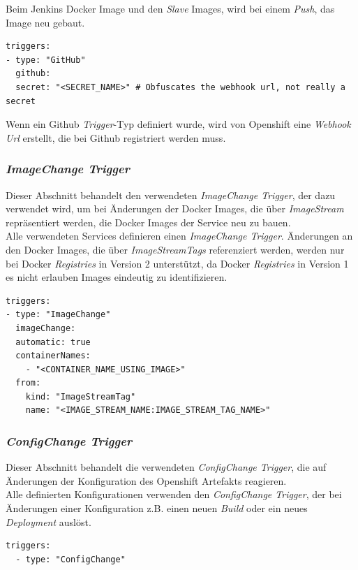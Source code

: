 Beim Jenkins Docker Image und den \emph{Slave} Images, wird bei einem \emph{Push}, das Image neu gebaut.

\begin{verbatim}
triggers:
- type: "GitHub"
  github:
  secret: "<SECRET_NAME>" # Obfuscates the webhook url, not really a secret
\end{verbatim}
Wenn ein Github \emph{Trigger}-Typ definiert wurde, wird von Openshift eine \emph{Webhook Url} erstellt, die bei Github registriert werden muss.

\subsubsection{\emph{ImageChange Trigger}}
Dieser Abschnitt behandelt den verwendeten \emph{ImageChange Trigger}, der dazu verwendet wird, um bei Änderungen der Docker Images, die über \emph{ImageStream} repräsentiert werden, die Docker Images der Service neu zu bauen.\\

Alle verwendeten Services definieren einen \emph{ImageChange Trigger}. Änderungen an den Docker Images, die über \emph{ImageStreamTags} referenziert werden, werden nur bei Docker \emph{Registries} in Version 2 unterstützt, da Docker \emph{Registries} in Version 1 es nicht erlauben Images eindeutig zu identifizieren.
\begin{verbatim}
triggers:
- type: "ImageChange"
  imageChange:
  automatic: true
  containerNames:
    - "<CONTAINER_NAME_USING_IMAGE>" 
  from:
    kind: "ImageStreamTag"
    name: "<IMAGE_STREAM_NAME:IMAGE_STREAM_TAG_NAME>"
\end{verbatim}

\subsubsection{\emph{ConfigChange Trigger}}
Dieser Abschnitt behandelt die verwendeten \emph{ConfigChange Trigger}, die auf Änderungen der Konfiguration des Openshift Artefakts reagieren.\\

Alle definierten Konfigurationen verwenden den \emph{ConfigChange Trigger}, der bei Änderungen einer Konfiguration z.B. einen neuen \emph{Build} oder ein neues \emph{Deployment} auslöst.
\begin{verbatim}
triggers:
  - type: "ConfigChange"
\end{verbatim}
